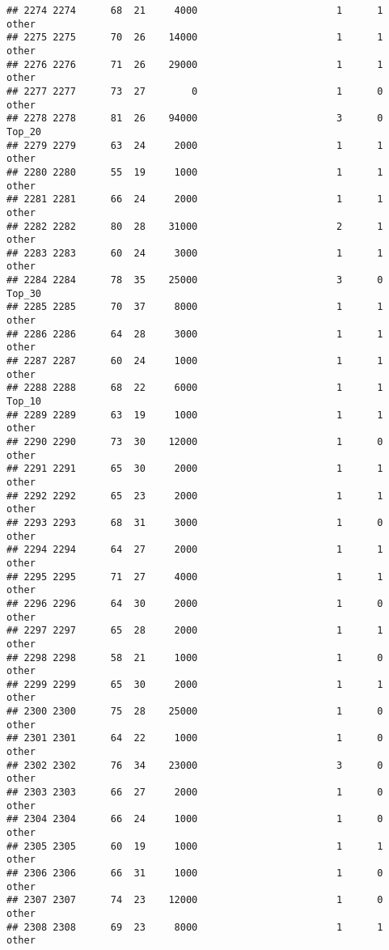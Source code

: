 \documentclass[
]{article}
\begin{document}
\begin{verbatim}
## 2274 2274      68  21     4000                        1      1    other
## 2275 2275      70  26    14000                        1      1    other
## 2276 2276      71  26    29000                        1      1    other
## 2277 2277      73  27        0                        1      0    other
## 2278 2278      81  26    94000                        3      0   Top_20
## 2279 2279      63  24     2000                        1      1    other
## 2280 2280      55  19     1000                        1      1    other
## 2281 2281      66  24     2000                        1      1    other
## 2282 2282      80  28    31000                        2      1    other
## 2283 2283      60  24     3000                        1      1    other
## 2284 2284      78  35    25000                        3      0   Top_30
## 2285 2285      70  37     8000                        1      1    other
## 2286 2286      64  28     3000                        1      1    other
## 2287 2287      60  24     1000                        1      1    other
## 2288 2288      68  22     6000                        1      1   Top_10
## 2289 2289      63  19     1000                        1      1    other
## 2290 2290      73  30    12000                        1      0    other
## 2291 2291      65  30     2000                        1      1    other
## 2292 2292      65  23     2000                        1      1    other
## 2293 2293      68  31     3000                        1      0    other
## 2294 2294      64  27     2000                        1      1    other
## 2295 2295      71  27     4000                        1      1    other
## 2296 2296      64  30     2000                        1      0    other
## 2297 2297      65  28     2000                        1      1    other
## 2298 2298      58  21     1000                        1      0    other
## 2299 2299      65  30     2000                        1      1    other
## 2300 2300      75  28    25000                        1      0    other
## 2301 2301      64  22     1000                        1      0    other
## 2302 2302      76  34    23000                        3      0    other
## 2303 2303      66  27     2000                        1      0    other
## 2304 2304      66  24     1000                        1      0    other
## 2305 2305      60  19     1000                        1      1    other
## 2306 2306      66  31     1000                        1      0    other
## 2307 2307      74  23    12000                        1      0    other
## 2308 2308      69  23     8000                        1      1    other

\end{verbatim}
\end{document}
